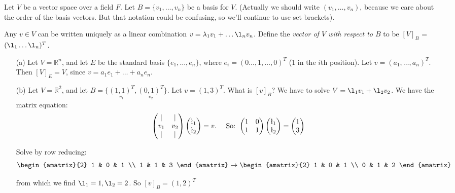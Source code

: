 \pagebreak
{}

\begin{definition} 
 Let $V$ be a vector space over a field $F.$ Let $B = \{v_1,\dots,v_n\}$ be a basis for $V$. (Actually we should write $(v_1,\dots,v_n)$, because we care about the order of the basis vectors. But that notation could be confusing, so we'll continue to use set brackets).
 
 Any $v \in V$ can be written uniquely as a linear combination $v = \lambda_1v_1 + \dots \l_nv_n$. Define the \emph{vector of $V$ with respect to $B$} to be $[V]_B$ = $(\l_1 \dots \l_n)^T$.
 \end{definition}\vspace*{10pt}


\begin{examples} \begin{itemize}
 \item[(a)] Let $V = \mathbb{R}^n$, and let $E$ be the standard basis $\{e_1,\dots,e_n\}$, where $e_i = (0\dots,1,\dots,0)^T$ (1 in the $i$th position). Let $v = (a_1, \dots ,a_n)^T.$ Then $[V]_E = V$, since $v = a_1e_1 + \dots + a_ne_n$.
 \item[(b)] Let $V = \mathbb{R}^2$, and let $B = \{\underset{v_1}{(1,1)^T},\underset{v_2}{(0,1)^T}\}$. Let $v = (1,3)^T$. What is $[v]_B$? We have to solve $V = \l_1v_1 + \l_2v_2$. We have the matrix equation:
 \[\begin{pmatrix}
| &  | \\ v_1 & v_2 \\ | & |
\end{pmatrix} 
\begin{pmatrix}
 \l_1 \\ \l_2 \end{pmatrix} = v. \quad \text{ So: }
 \begin{pmatrix}
1 & 0 \\ 1 & 1
\end{pmatrix} 
\begin{pmatrix}
 \l_1 \\ \l_2 \end{pmatrix} = \begin{pmatrix}
 1 \\ 3
 \end{pmatrix}\]


Solve by row reducing:
\[\begin{amatrix}{2}
1 & 0  & 1 \\ 1 & 1 & 3
\end{amatrix}
\rightarrow 
\begin{amatrix}{2}
1 & 0 & 1 \\ 0 & 1 & 2 
\end{amatrix}
\]

from which we find $\l_1 = 1, \l_2 = 2$. So $[v]_B = (1,2)^T$
\end{itemize} 
\end{examples}\vspace*{10pt}

